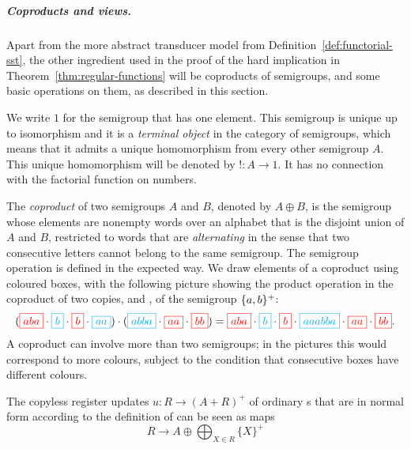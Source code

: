 


\subparagraph*{Coproducts and views.}
\label{sec:coproducts-and-views}

Apart from the more abstract transducer model from Definition~\ref{def:functorial-sst}, the other ingredient used  in the proof of the hard implication in Theorem~\ref{thm:regular-functions} will be coproducts of semigroups, and some basic operations on them, as described in this section.

We write $1$ for the semigroup that has one element. This semigroup is unique up to isomorphism and it is a \emph{terminal object} in the category of semigroups, which means that it admits a unique homomorphism from every other semigroup $A$. This unique homomorphism will be denoted by $!\colon A \to 1$. It has no connection with the factorial function on numbers. 

The \emph{coproduct}  of two semigroups $A$ and $B$, denoted by $A \oplus B$, is the semigroup whose elements are nonempty words over an alphabet that is the disjoint union of $A$ and $B$, restricted to words that are \emph{alternating} in the sense that two consecutive letters cannot belong to the same semigroup. The semigroup operation is defined in the expected way. We draw elements of a coproduct using coloured boxes, with the following picture showing the product operation in the coproduct of two copies,  and , of the semigroup $\{a,b\}^+$:
\begin{align*}
    ({\color{red}\boxed{aba}} \cdot 
    {\color{cyan}\boxed{b}} \cdot 
    {\color{red}\boxed{b}} \cdot 
    {\color{cyan}\boxed{aa}}) \cdot 
    (
        {\color{cyan}\boxed{abba}} \cdot 
        {\color{red}\boxed{aa}} \cdot 
        {\color{red}\boxed{bb}}
    )
    = 
{\color{red}\boxed{aba}} \cdot 
    {\color{cyan}\boxed{b}} \cdot 
    {\color{red}\boxed{b}} \cdot 
    {\color{cyan}\boxed{aaabba}} \cdot 
        {\color{red}\boxed{aa}} \cdot 
        {\color{red}\boxed{bb}}.
\end{align*}
A coproduct can involve more than two semigroups; in the pictures this would correspond to more colours, subject to the condition that  consecutive boxes have different colours.
\begin{remark}
  The copyless register updates $u : R \to (A + R)^+$ of ordinary \sst{}s that are in normal form according to the definition of  can be seen as maps
  \[ R \to A \oplus \bigoplus_{X\in R} \{X\}^+ \]
\end{remark}






